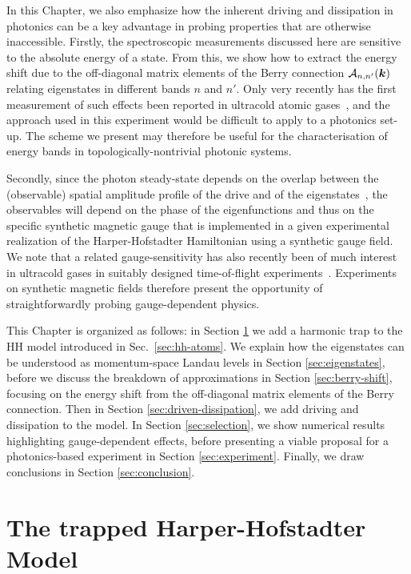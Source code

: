 In this Chapter, we also emphasize how the inherent driving and
dissipation in photonics can be a key advantage in probing properties
that are otherwise inaccessible.  Firstly, the spectroscopic
measurements discussed here are sensitive to the absolute energy of a
state. From this, we show how to extract the energy shift due to the
off-diagonal matrix elements of the Berry connection
$\mathcal{A}_{n,n'}(\bm{k})$ relating eigenstates in different bands $n$
and $n'$. Only very recently has the first measurement of such effects
been reported in ultracold atomic
gases~\cite{Grusdt2014nonabelian,tracy2015arxiv}, and the approach
used in this experiment would be difficult to apply to a photonics
set-up. The scheme we present may therefore be useful for the
characterisation of energy bands in topologically-nontrivial photonic
systems.

Secondly, since the photon steady-state depends on the overlap between
the (observable) spatial amplitude profile of the drive and of the
eigenstates~\cite{carusotto2013fluids}, the observables will depend on
the phase of the eigenfunctions and thus on the specific synthetic
magnetic gauge that is implemented in a given experimental realization
of the Harper-Hofstadter Hamiltonian using a synthetic gauge field. We
note that a related gauge-sensitivity has also recently been of much
interest in ultracold gases in suitably designed time-of-flight
experiments~\cite{kennedy2015bec,spielman2011gauge, spielman_gauge,
tomoki2015nv}. Experiments on synthetic magnetic fields therefore
present the opportunity of straightforwardly probing gauge-dependent
physics.

This Chapter is organized as follows: in Section \ref{sec:model} we
add a harmonic trap to the HH model introduced in
Sec.~\ref{sec:hh-atoms}. We explain how the eigenstates can be
understood as momentum-space Landau levels in Section
\ref{sec:eigenstates}, before we discuss the breakdown of
approximations in Section \ref{sec:berry-shift}, focusing on the
energy shift from the off-diagonal matrix elements of the Berry
connection. Then in Section \ref{sec:driven-dissipation}, we add
driving and dissipation to the model. In Section \ref{sec:selection},
we show numerical results highlighting gauge-dependent effects, before
presenting a viable proposal for a photonics-based experiment in
Section \ref{sec:experiment}. Finally, we draw conclusions in Section
\ref{sec:conclusion}.


\section{The trapped Harper-Hofstadter Model}
\label{sec:model}

